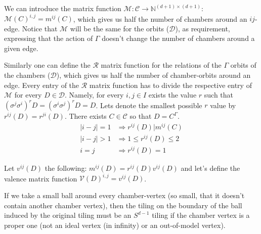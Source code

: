 \documentclass[12pt,a4paper]{article}
\theoremstyle{plain}%
\theoremstyle{definition}
\theoremstyle{remark}
\begin{document}
We can introduce the matrix function $\mathcal{M}: \mathcal{C}
\rightarrow \mathbb{N}^{(d+1)\times (d+1)}$: $\mathcal{M}(C)^{i,j}=m^{ij}(C)$, which
gives us half the number of chambers around an $ij$-edge. Notice that $\mathcal{M}$
will be the same for the orbits ($\mathcal{D}$), as requirement, expressing that
the action of $\Gamma$ doesn't change the number of chambers around a given
edge.

Similarly one can define the $\mathcal{R}$ matrix function for the
relations of the $\Gamma$ orbits of the chambers ($\mathcal{D}$), which gives us
half the number of chamber-orbits around an edge. Every entry of the $\mathcal{R}$
matrix function has to divide the respective entry of $\mathcal{M}$ for
every $D\in\mathcal{D}$. Namely, for every $i,j\in I$ exists the value $r$ such that
$(\sigma^j\sigma^i)^rD=(\sigma^i\sigma^j)^rD=D$. Lets denote the smallest
possible $r$ value by $r^{ij}(D)=r^{ji}(D)$. There exists $C\in\mathcal{C}$ so
that $D=C^\Gamma$.
\begin{align}
  |i-j|=1 & \Rightarrow r^{ij}(D)|m^{ij}(C) \\
  |i-j|>1 & \Rightarrow 1\leq r^{ij}(D)\leq 2 \\
  i=j & \Rightarrow r^{ij}(D)=1
\end{align}

Let $v^{ij}(D)$ the following: $m^{ij}(D)=r^{ij}(D)v^{ij}(D)$ and
let's define the valence matrix function
$\mathcal{V}(D)^{i,j}=v^{ij}(D)$.


If we take a small ball around every chamber-vertex (so small, that it doesn't
contain another chamber vertex), then the tiling on the boundary of the ball
induced by the original tiling must be an $S^{d-1}$ tiling \cite{D87} if the
chamber vertex is a proper one (not an ideal vertex (in infinity) or an
out-of-model vertex).
\end{document}
